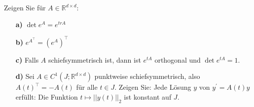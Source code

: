 \begin{exercise}
Zeigen Sie für $A \in \mathbb{R}^{d \times d}$:
\begin{itemize}
  \item [\textbf{a)}] $\det e^A = e^{tr A}$
  \item [\textbf{b)}] $e^{A^{\top}} = (e^A)^{\top}$
  \item [\textbf{c)}] Falls $A$ schiefsymmetrisch ist, dann ist $e^{tA}$ orthogonal
  und $\det e^{tA} = 1$.
  \item [\textbf{d)}] Sei $A \in C^1(J;\mathbb{R}^{d \times d})$ punktweise
  schiefsymmetrisch, also $A(t)^{\top} = -A(t)$ für alle $t \in J$.
  Zeigen Sie: Jede Lösung $y$ von $y^{\prime} = A(t)y$ erfüllt:
  Die Funktion $t \mapsto ||y(t)||_2$ ist konstant auf $J$.
\end{itemize}
\end{exercise}
\begin{solution}
\end{solution}
